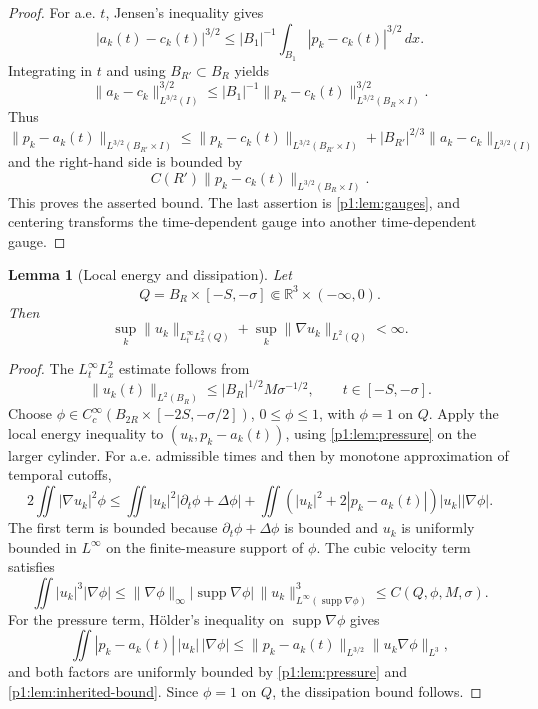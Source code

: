\documentclass[11pt]{amsart}
\theoremstyle{plain}
\newtheorem{lemma}[lemma]{Lemma}
\theoremstyle{definition}
\theoremstyle{remark}
\numberwithin{equation}{section}
\newcommand{\R}{\mathbb R}
\newcommand{\supp}{\operatorname{supp}}
\begin{document}
\begin{proof}
For a.e. \(t\), Jensen's inequality gives
\[
   |a_k(t)-c_k(t)|^{3/2}
   \le |B_1|^{-1}\int_{B_1}|p_k-c_k(t)|^{3/2}\,dx .
\]
Integrating in \(t\) and using \(B_{R'}\subset B_R\) yields
\[
   \|a_k-c_k\|_{L^{3/2}(I)}^{3/2}
   \le
   |B_1|^{-1}\|p_k-c_k(t)\|_{L^{3/2}(B_R\times I)}^{3/2}.
\]
Thus
\[
   \|p_k-a_k(t)\|_{L^{3/2}(B_{R'}\times I)}
   \le
   \|p_k-c_k(t)\|_{L^{3/2}(B_{R'}\times I)}
   +|B_{R'}|^{2/3}\|a_k-c_k\|_{L^{3/2}(I)}
\]
and the right-hand side is bounded by
\[
   C(R')\|p_k-c_k(t)\|_{L^{3/2}(B_R\times I)} .
\]
This proves the asserted bound.
The last assertion is \cref{p1:lem:gauges}, and centering transforms the
time-dependent gauge into another time-dependent gauge.
\end{proof}

\begin{lemma}[Local energy and dissipation]\label{p1:lem:energy-diss}
Let
\[
   Q=B_R\times[-S,-\sigma]\Subset\R^3\times(-\infty,0).
\]
Then
\[
   \sup_k\|u_k\|_{L^\infty_tL^2_x(Q)}
   +\sup_k\|\nabla u_k\|_{L^2(Q)}<\infty .
\]
\end{lemma}

\begin{proof}
The \(L^\infty_tL^2_x\) estimate follows from
\[
   \|u_k(t)\|_{L^2(B_R)}
   \le |B_R|^{1/2}M\sigma^{-1/2},
   \qquad t\in[-S,-\sigma].
\]
Choose \(\phi\in C_c^\infty(B_{2R}\times[-2S,-\sigma/2])\), \(0\le\phi\le1\),
with \(\phi=1\) on \(Q\).  Apply the local energy inequality to
\((u_k,p_k-a_k(t))\), using \cref{p1:lem:pressure} on the larger cylinder.  For
a.e. admissible times and then by monotone approximation of temporal cutoffs,
\[
   2\iint |\nabla u_k|^2\phi
   \le
   \iint |u_k|^2|\partial_t\phi+\Delta\phi|
   +\iint (|u_k|^2+2|p_k-a_k(t)|)|u_k||\nabla\phi|.
\]
The first term is bounded because \(\partial_t\phi+\Delta\phi\) is bounded
and \(u_k\) is uniformly bounded in \(L^\infty\) on the finite-measure support
of \(\phi\).  The cubic velocity term satisfies
\[
   \iint |u_k|^3|\nabla\phi|
   \le
   \|\nabla\phi\|_\infty
   |\supp\nabla\phi|\,\|u_k\|_{L^\infty(\supp\nabla\phi)}^3
   \le C(Q,\phi,M,\sigma).
\]
For the pressure term, H\"older's inequality on \(\supp\nabla\phi\) gives
\[
   \iint |p_k-a_k(t)|\,|u_k|\,|\nabla\phi|
   \le
   \|p_k-a_k(t)\|_{L^{3/2}}
   \|u_k\nabla\phi\|_{L^3},
\]
and both factors are uniformly bounded by \cref{p1:lem:pressure} and
\cref{p1:lem:inherited-bound}.  Since \(\phi=1\) on \(Q\), the dissipation bound
follows.
\end{proof}
\end{document}
